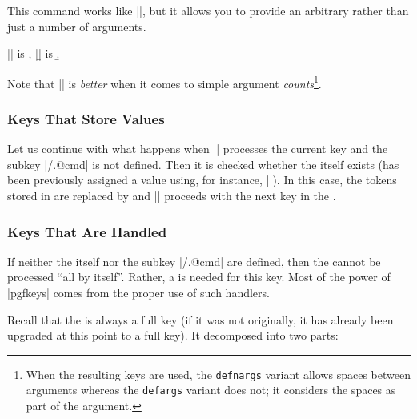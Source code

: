 \begin{command}{\pgfkeysdefargs{}}
    This command works like |\pgfkeysdefnargs|, but it allows you to provide an
    arbitrary  rather than just a number of arguments.
\begin{codeexample}[]

|\a| is \a, |\b| is \b.
\end{codeexample}
    Note that |\pgfkeysdefnargs| is \emph{better} when it comes to simple
    argument \emph{counts}\footnote{When the resulting keys are used, the
    \texttt{defnargs} variant allows spaces between arguments whereas the
    \texttt{defargs} variant does not; it considers the spaces as part of the
    argument.}.
\end{command}



\subsubsection{Keys That Store Values}

Let us continue with what happens when |\pgfkeys| processes the current key and
the subkey |/.@cmd| is not defined. Then it is checked whether the
 itself exists (has been previously assigned a value using, for
instance, |\pgfkeyssetvalue|). In this case, the tokens stored in 
are replaced by  and |\pgfkeys| proceeds with the next key in the
.


\subsubsection{Keys That Are Handled}
\label{section-key-handlers}

If neither the  itself nor the subkey |/.@cmd| are defined,
then the  cannot be processed ``all by itself''. Rather, a
 is needed for this key. Most of the power of |pgfkeys| comes
from the proper use of such handlers.

Recall that the  is always a full key (if it was not originally, it
has already been upgraded at this point to a full key). It decomposed into two
parts:

